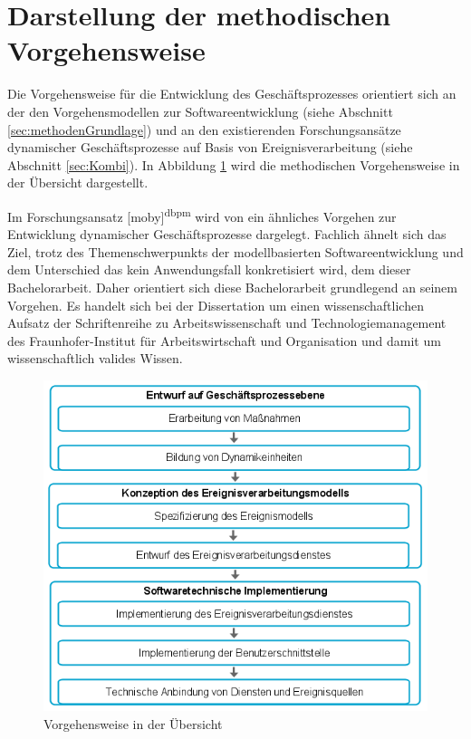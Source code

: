 \section{Darstellung der methodischen Vorgehensweise}\label{sec:methode}
Die Vorgehensweise für die Entwicklung des Geschäftsprozesses orientiert sich an der den Vorgehensmodellen zur Softwareentwicklung (siehe Abschnitt \ref{sec:methodenGrundlage}) und an den existierenden Forschungsansätze dynamischer Geschäftsprozesse auf Basis von Ereignisverarbeitung (siehe Abschnitt \ref{sec:Kombi}). 
In Abbildung \ref{fig:Vorgehensweise in der Übersicht} wird die methodischen Vorgehensweise in der Übersicht dargestellt.  

Im Forschungsansatz [moby]\textsuperscript{dbpm} wird von \citeauthor{Vidackovic.2014} ein ähnliches Vorgehen zur Entwicklung dynamischer Geschäftsprozesse dargelegt. Fachlich ähnelt sich das Ziel, trotz
des Themenschwerpunkts der modellbasierten Softwareentwicklung und dem Unterschied das kein Anwendungsfall konkretisiert wird, dem dieser Bachelorarbeit. \cite{Vidackovic.2014}
Daher orientiert sich diese Bachelorarbeit grundlegend an seinem Vorgehen. Es handelt sich bei der Dissertation um einen wissenschaftlichen Aufsatz der Schriftenreihe zu Arbeitswissenschaft und Technologiemanagement des Fraunhofer-Institut für Arbeitswirtschaft und Organisation und damit um wissenschaftlich valides Wissen.

\begin{figure}[H]
	\centering 
    \includegraphics[width=\textwidth]{img/methode.png}	
    \caption[Vorgehensweise in der Übersicht]
    {Vorgehensweise in der Übersicht\protect\footnotemark}
    \label{fig:Vorgehensweise in der Übersicht}
\end{figure}

